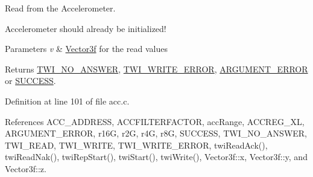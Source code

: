 Read from the Accelerometer. 

Accelerometer should already be initialized! 
\begin{DoxyParams}{Parameters}
{\em v} & \hyperlink{struct_vector3f}{Vector3f} for the read values \\
\hline
\end{DoxyParams}
\begin{DoxyReturn}{Returns}
\hyperlink{group__error_gga2c3e4bb40f36b262a5214e2da2bca9c5a04d5943ba652af2205c88b247e0c659c}{T\-W\-I\-\_\-\-N\-O\-\_\-\-A\-N\-S\-W\-E\-R}, \hyperlink{group__error_gga2c3e4bb40f36b262a5214e2da2bca9c5ac0e3b3463dcaf220e54794b4711708c9}{T\-W\-I\-\_\-\-W\-R\-I\-T\-E\-\_\-\-E\-R\-R\-O\-R}, \hyperlink{group__error_gga2c3e4bb40f36b262a5214e2da2bca9c5a49ccf277a69dd938c591928aa27c66cc}{A\-R\-G\-U\-M\-E\-N\-T\-\_\-\-E\-R\-R\-O\-R} or \hyperlink{group__error_gga2c3e4bb40f36b262a5214e2da2bca9c5ac7f69f7c9e5aea9b8f54cf02870e2bf8}{S\-U\-C\-C\-E\-S\-S}. 
\end{DoxyReturn}


Definition at line 101 of file acc.\-c.



References A\-C\-C\-\_\-\-A\-D\-D\-R\-E\-S\-S, A\-C\-C\-F\-I\-L\-T\-E\-R\-F\-A\-C\-T\-O\-R, acc\-Range, A\-C\-C\-R\-E\-G\-\_\-\-X\-L, A\-R\-G\-U\-M\-E\-N\-T\-\_\-\-E\-R\-R\-O\-R, r16\-G, r2\-G, r4\-G, r8\-G, S\-U\-C\-C\-E\-S\-S, T\-W\-I\-\_\-\-N\-O\-\_\-\-A\-N\-S\-W\-E\-R, T\-W\-I\-\_\-\-R\-E\-A\-D, T\-W\-I\-\_\-\-W\-R\-I\-T\-E, T\-W\-I\-\_\-\-W\-R\-I\-T\-E\-\_\-\-E\-R\-R\-O\-R, twi\-Read\-Ack(), twi\-Read\-Nak(), twi\-Rep\-Start(), twi\-Start(), twi\-Write(), Vector3f\-::x, Vector3f\-::y, and Vector3f\-::z.


